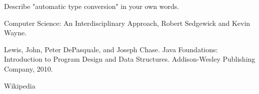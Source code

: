 \begin{exercise}
Describe "automatic type conversion" in your own words. 
\end{exercise}


Computer Science: An Interdisciplinary Approach, Robert Sedgewick and Kevin Wayne.

Lewis, John, Peter DePasquale, and Joseph Chase. Java Foundations: Introduction to Program Design and Data Structures. Addison-Wesley Publishing Company, 2010.

Wikipedia

